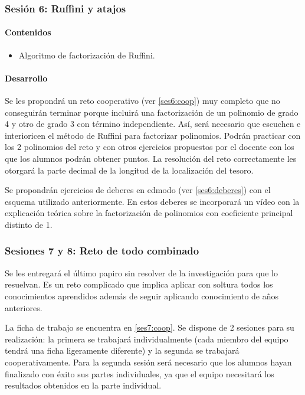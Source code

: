 \subsubsection{Sesión 6: Ruffini y atajos}

\paragraph{Contenidos}
\begin{itemize}
	\item Algoritmo de factorización de Ruffini.
\end{itemize}

\paragraph{Desarrollo}

Se les propondrá un reto cooperativo (ver \ref{ses6:coop}) muy completo que no conseguirán terminar porque incluirá una factorización de un polinomio de grado 4 y otro de grado 3 con término independiente.
%
Así, será necesario que escuchen e interioricen el método de Ruffini para factorizar polinomios.
%
Podrán practicar con los 2 polinomios del reto y con otros ejercicios propuestos por el docente con los que los alumnos podrán obtener puntos.
%
La resolución del reto correctamente les otorgará la parte decimal de la longitud de la localización del tesoro.

Se propondrán ejercicios de deberes en edmodo (ver \ref{ses6:deberes}) con el esquema utilizado anteriormente.
%
En estos deberes se incorporará un vídeo con la explicación teórica sobre la factorización de polinomios con coeficiente principal distinto de 1.

\subsubsection{Sesiones 7 y 8: Reto de todo combinado}

Se les entregará el último papiro sin resolver de la investigación para que lo resuelvan.
%
Es un reto complicado que implica aplicar con soltura todos los conocimientos aprendidos además de seguir aplicando conocimiento de años anteriores.

La ficha de trabajo se encuentra en \ref{ses7:coop}. 
%
Se dispone de 2 sesiones para su realización: la primera se trabajará individualmente (cada miembro del equipo tendrá una ficha ligeramente diferente) y la segunda se trabajará cooperativamente.
%
Para la segunda sesión será necesario que los alumnos hayan finalizado con éxito sus partes individuales, ya que el equipo necesitará los resultados obtenidos en la parte individual.



